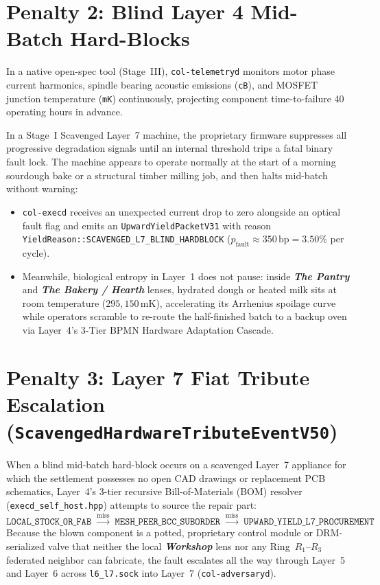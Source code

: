 \section{Penalty 2: Blind Layer 4 Mid-Batch Hard-Blocks}
\label{sec:l7-penalty-blind-hardblocks}

In a native open-spec tool (Stage~III), \texttt{col-telemetryd} monitors motor phase current harmonics, spindle bearing acoustic emissions (\texttt{cB}), and MOSFET junction temperature (\texttt{mK}) continuously, projecting component time-to-failure 40 operating hours in advance.

In a Stage~I Scavenged Layer~7 machine, the proprietary firmware suppresses all progressive degradation signals until an internal threshold trips a fatal binary fault lock. The machine appears to operate normally at the start of a morning sourdough bake or a structural timber milling job, and then halts mid-batch without warning:
\begin{itemize}
    \item \texttt{col-execd} receives an unexpected current drop to zero alongside an optical fault flag and emits an \texttt{UpwardYieldPacketV31} with reason \texttt{YieldReason::SCAVENGED\_L7\_BLIND\_HARDBLOCK} ($p_{\mathrm{fault}} \approx 350\,\mathrm{bp} = 3.50\%$ per cycle).
    \item Meanwhile, biological entropy in Layer~1 does not pause: inside \textbf{\textit{The Pantry}} and \textbf{\textit{The Bakery / Hearth}} lenses, hydrated dough or heated milk sits at room temperature ($295{,}150\,\mathrm{mK}$), accelerating its Arrhenius spoilage curve while operators scramble to re-route the half-finished batch to a backup oven via Layer~4's 3-Tier BPMN Hardware Adaptation Cascade.
\end{itemize}

\section{Penalty 3: Layer 7 Fiat Tribute Escalation (\texttt{ScavengedHardwareTributeEventV50})}
\label{sec:l7-penalty-tribute}

When a blind mid-batch hard-block occurs on a scavenged Layer~7 appliance for which the settlement possesses no open CAD drawings or replacement PCB schematics, Layer~4's 3-tier recursive Bill-of-Materials (BOM) resolver (\texttt{execd\_self\_host.hpp}) attempts to source the repair part:
\begin{equation}
\texttt{LOCAL\_STOCK\_OR\_FAB} \;\xrightarrow{\text{miss}}\; \texttt{MESH\_PEER\_BCC\_SUBORDER} \;\xrightarrow{\text{miss}}\; \texttt{UPWARD\_YIELD\_L7\_PROCUREMENT}
\label{eq:ch2-bom-escalation}
\end{equation}
Because the blown component is a potted, proprietary control module or DRM-serialized valve that neither the local \textbf{\textit{Workshop}} lens nor any Ring~$R_1\text{--}R_3$ federated neighbor can fabricate, the fault escalates all the way through Layer~5 and Layer~6 across \texttt{l6\_l7.sock} into Layer~7 (\texttt{col-adversaryd}).

